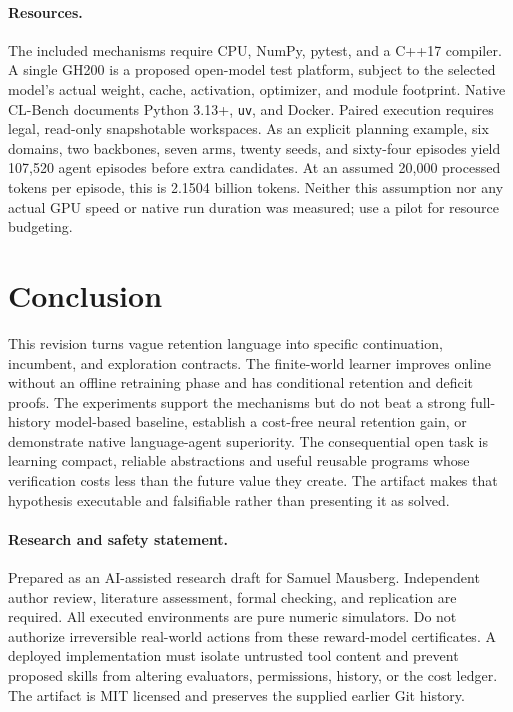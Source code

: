 \documentclass[10pt,twocolumn]{article}
\begin{document}
\paragraph{Resources.}
The included mechanisms require CPU, NumPy, pytest, and a C++17 compiler. A single
GH200 is a proposed open-model test platform, subject to the selected model's
actual weight, cache, activation, optimizer, and module footprint. Native CL-Bench
documents Python 3.13+, \texttt{uv}, and Docker. Paired execution requires legal,
read-only snapshotable workspaces. As an explicit planning example, six domains,
two backbones, seven arms, twenty seeds, and sixty-four episodes yield 107,520
agent episodes before extra candidates. At an assumed 20,000 processed tokens
per episode, this is 2.1504 billion tokens. Neither this assumption nor any actual
GPU speed or native run duration was measured; use a pilot for resource budgeting.

\section{Conclusion}
This revision turns vague retention language into specific continuation,
incumbent, and exploration contracts. The finite-world learner improves online
without an offline retraining phase and has conditional retention and deficit
proofs. The experiments support the mechanisms but do not beat a strong
full-history model-based baseline, establish a cost-free neural retention gain,
or demonstrate native language-agent superiority. The consequential open task is
learning compact, reliable abstractions and useful reusable programs whose
verification costs less than the future value they create. The artifact makes
that hypothesis executable and falsifiable rather than presenting it as solved.

\paragraph{Research and safety statement.}
Prepared as an AI-assisted research draft for Samuel Mausberg. Independent author
review, literature assessment, formal checking, and replication are required.
All executed environments are pure numeric simulators. Do not authorize
irreversible real-world actions from these reward-model certificates. A deployed
implementation must isolate untrusted tool content and prevent proposed skills
from altering evaluators, permissions, history, or the cost ledger. The artifact
is MIT licensed and preserves the supplied earlier Git history.

{\small}
\end{document}
